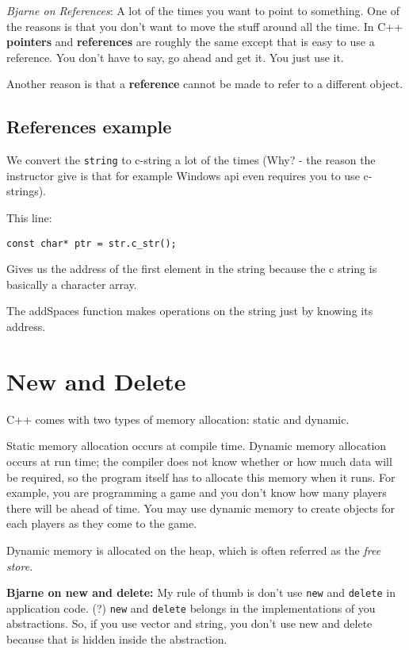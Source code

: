 \documentclass[11pt, a4paper]{article}
\begin{document}
\textit{Bjarne on References}: A lot of the times you want to point to something. One of the reasons is that you don't want to move the stuff around all the time. In C++ \textbf{pointers} and \textbf{references} are roughly the same except that is easy to use a reference. You don't have to say, go ahead and get it. You just use it.  

Another reason is that a \textbf{reference} cannot be made to refer to a different object. 

\subsection{References example}%
\label{sub:references_example}

We convert the \texttt{string} to c-string a lot of the times (Why? - the reason the instructor give is that for example Windows api even requires you to use c-strings).  

This line:

\texttt{const char* ptr = str.c\_str();} 

Gives us the address of the first element in the string because the c string is basically a character array.


The addSpaces function makes operations on the string just by knowing its address. 

\section{New and Delete}%
\label{sec:new_and_delete}

C++ comes with two types of memory allocation: static and dynamic. 

Static memory allocation occurs at compile time. Dynamic memory allocation occurs at run time; the compiler does not know whether or how much data will be required, so the program itself has to allocate this memory when it runs. For example, you are programming a game and you don't know how many players there will be ahead of time. You may use dynamic memory to create objects for each players as they come to the game. 

Dynamic memory is allocated on the heap, which is often referred as the \textit{free store}. 


\textbf{Bjarne on new and delete:} My rule of thumb is don't use \texttt{new} and \texttt{delete} in application code. (?) \texttt{new} and \texttt{delete} belongs in the implementations of you abstractions. So, if you use vector and string, you don't use new and delete because that is hidden inside the abstraction. 
\end{document}
